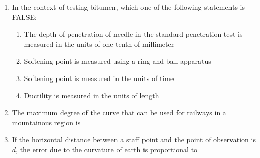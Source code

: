 \documentclass[journal,12pt,onecolumn]{article}
\theoremstyle{remark}
\begin{document}
\begin{enumerate}
\hfill{}
\begin{enumerate}
\end{enumerate}

\item In the context of testing bitumen, which one of the following statements is FALSE:

\hfill{}
\begin{enumerate}
    \item The depth of penetration of needle in the standard penetration test is measured in the units of one-tenth of millimeter
    \item Softening point is measured using a ring and ball apparatus
    \item Softening point is measured in the units of time
    \item Ductility is measured in the units of length
\end{enumerate}

\item The maximum degree of the curve that can be used for railways in a mountainous region is

\hfill{}
\begin{enumerate}
\end{enumerate}

\item If the horizontal distance between a staff point and the point of observation is $d$, the error due to the curvature of earth is proportional to

\hfill{}
\begin{enumerate}
\end{enumerate}


\end{enumerate}
\end{document}
